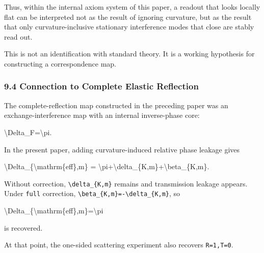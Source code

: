 \documentclass[
  a4paper,
]{article}
\newenvironment{Shaded}{}{}
\newcommand{\NormalTok}[1]{#1}
\begin{document}
Thus, within the internal axiom system of this paper, a readout that
looks locally flat can be interpreted not as the result of ignoring
curvature, but as the result that only curvature-inclusive stationary
interference modes that close are stably read out.

This is not an identification with standard theory. It is a working
hypothesis for constructing a correspondence map.

\subsubsection{9.4 Connection to Complete Elastic
Reflection}\label{connection-to-complete-elastic-reflection}

The complete-reflection map constructed in the preceding paper was an
exchange-interference map with an internal inverse-phase core:

\begin{Shaded}
\begin{Highlighting}[]
\NormalTok{\textbackslash{}Delta\_F=\textbackslash{}pi.}
\end{Highlighting}
\end{Shaded}

In the present paper, adding curvature-induced relative phase leakage
gives

\begin{Shaded}
\begin{Highlighting}[]
\NormalTok{\textbackslash{}Delta\_\{\textbackslash{}mathrm\{eff\},m\}}
\NormalTok{=}
\NormalTok{\textbackslash{}pi+\textbackslash{}delta\_\{K,m\}+\textbackslash{}beta\_\{K,m\}.}
\end{Highlighting}
\end{Shaded}

Without correction, \texttt{\textbackslash{}delta\_\{K,m\}} remains and
transmission leakage appears. Under \texttt{full} correction,
\texttt{\textbackslash{}beta\_\{K,m\}=-\textbackslash{}delta\_\{K,m\}},
so

\begin{Shaded}
\begin{Highlighting}[]
\NormalTok{\textbackslash{}Delta\_\{\textbackslash{}mathrm\{eff\},m\}=\textbackslash{}pi}
\end{Highlighting}
\end{Shaded}

is recovered.

At that point, the one-sided scattering experiment also recovers
\texttt{R=1,T=0}.
\end{document}
